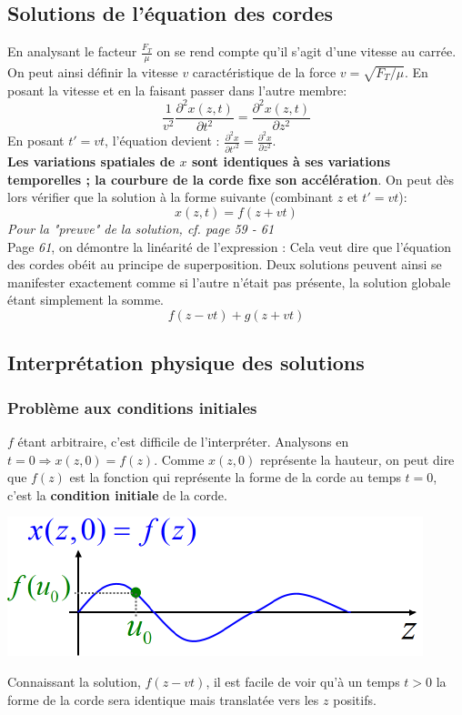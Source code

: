 \documentclass	[11pt, a4paper, openany]{book}
\begin{document}
\subsection{Solutions de l'équation des cordes}
En analysant le facteur $\frac{F_T}{\mu}$ on se rend compte qu'il s'agit d'une vitesse au carrée. On peut ainsi définir la vitesse $v$ caractéristique de la force $v = \sqrt{F_T/\mu}$. 
En posant la vitesse et en la faisant passer dans l'autre membre: 
\begin{equation}
\frac{1}{v^2}\frac{\partial^2 x(z, t)}{\partial t^2} = \frac{\partial^2 x(z, t)}{\partial z^2}
\end{equation}
En posant $t' = vt$, l'équation devient : $\frac{\partial^2 x}{\partial t'^2} = \frac{\partial^2 x}{\partial z^2}$.\\
\textbf{Les variations spatiales de $x$ sont identiques à ses variations temporelles ; la courbure de la corde fixe son accélération}. On peut dès lors vérifier que la solution à la forme suivante (combinant $z$ et $t' = vt$): 
\begin{equation}
x(z,t) = f(z + vt)
\end{equation}
\textit{Pour la "preuve" de la solution, cf. page 59 - 61}\\
Page \textit{61}, on démontre la linéarité de l'expression : Cela veut dire que l'équation des cordes obéit au principe de superposition. Deux solutions peuvent ainsi se manifester exactement comme si l'autre n'était pas présente, la solution globale étant simplement la somme.
\begin{equation}
f(z-vt) + g(z+vt)
\end{equation}

\subsection{Interprétation physique des solutions}
\subsubsection{Problème aux conditions initiales}
$f$ étant arbitraire, c'est difficile de l'interpréter. Analysons en $t = 0 \Rightarrow x(z, 0) = f(z)$. Comme $x(z, 0)$ représente la hauteur, on peut dire que $f(z)$ est la fonction qui représente la forme de la corde au temps $t = 0$, c'est la \textbf{condition initiale} de la corde.
\begin{center}
\includegraphics[scale=0.55]{oo/image25.png}
\end{center}
Connaissant la solution, $f(z - vt)$, il est facile de voir qu'à un temps $t > 0$ la forme de la corde sera identique mais translatée vers les $z$ positifs.\\
\end{document}
